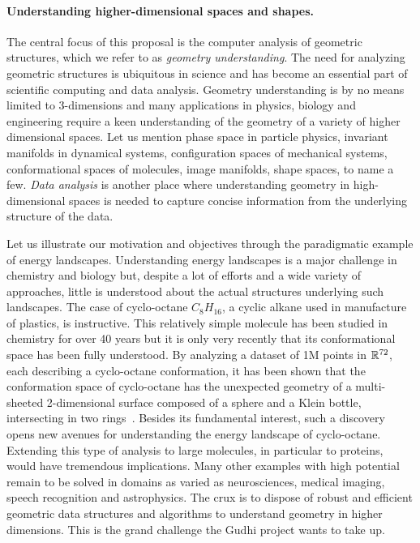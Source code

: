 \paragraph{Understanding higher-dimensional spaces and shapes.} 
The central focus of this proposal is  the computer %
analysis of geometric structures, which we refer to as {\em geometry understanding}.  The need for analyzing geometric structures is ubiquitous in science and has become an essential part of scientific computing and data analysis. Geometry understanding is by no means limited to 3-dimensions and many applications in physics, biology and engineering require a keen understanding of the geometry of a variety of higher dimensional spaces. Let us mention phase space in particle physics, invariant manifolds in dynamical systems, configuration spaces of mechanical systems, conformational spaces of molecules, image manifolds, shape spaces, to name a few. {\em Data analysis}  is another place where understanding
geometry in high-dimensional spaces is needed to
capture concise information from the underlying structure of the data. 

Let us illustrate our motivation and objectives through the paradigmatic example of energy landscapes. Understanding  energy landscapes is a major challenge in chemistry and biology but,  despite a lot of efforts and a wide variety of approaches, little is understood about the actual structures underlying such landscapes. The case of cyclo-octane $C_8H_{16}$, a cyclic alkane used in manufacture of plastics, is instructive. This relatively simple molecule has been studied in chemistry for over 40 years but it is only very recently that its conformational space has been fully understood. By analyzing a dataset of 1M points in $\mathbb R^{72}$, each describing a cyclo-octane conformation, it has been shown that the conformation space of cyclo-octane has the unexpected geometry of  a multi-sheeted 2-dimensional surface composed of a sphere and a Klein bottle, intersecting in two rings~\cite{mtcw-tco-2010}.  Besides its fundamental interest, such a discovery opens new avenues for understanding the energy landscape of cyclo-octane. Extending this type of analysis to large molecules, in particular to proteins, would have tremendous implications. Many other examples with high potential remain to be solved in domains as varied as neurosciences, medical imaging, speech recognition and astrophysics. The crux is to dispose of robust and efficient geometric data structures and algorithms to understand geometry in higher dimensions. This is the grand challenge the Gudhi project wants to take up.


